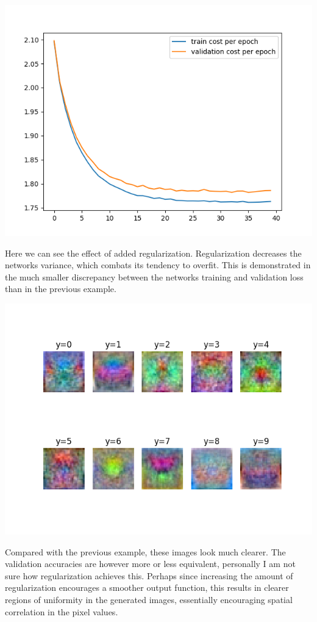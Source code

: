 \documentclass[11pt,a4paper]{article}
\begin{document}
\includegraphics[width=\textwidth]{lambda_0.1.png}

Here we can see the effect of added regularization. Regularization decreases the networks variance, which combats its tendency to overfit. This is demonstrated in the much smaller discrepancy between the networks training and validation loss than in the previous example.

\includegraphics[width=\textwidth]{lambda_0.1_montage.png}

Compared with the previous example, these images look much clearer. The validation accuracies are however more or less equivalent, personally I am not sure how regularization achieves this. Perhaps since increasing the amount of regularization encourages a smoother output function, this results in clearer regions of uniformity in the generated images, essentially encouraging spatial correlation in the pixel values.
\end{document}

